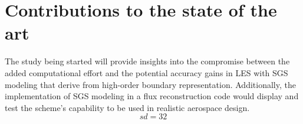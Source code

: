 \section{Contributions to the state of the art}
The study being started will provide insights into the compromise between the added computational effort and the potential accuracy gains in LES with SGS modeling that derive from high-order boundary representation. Additionally, the implementation of SGS modeling in a flux reconstruction code  would display and test the scheme's capability to be used in realistic aerospace design.
\begin{equation}
sd = 32
\end{equation}